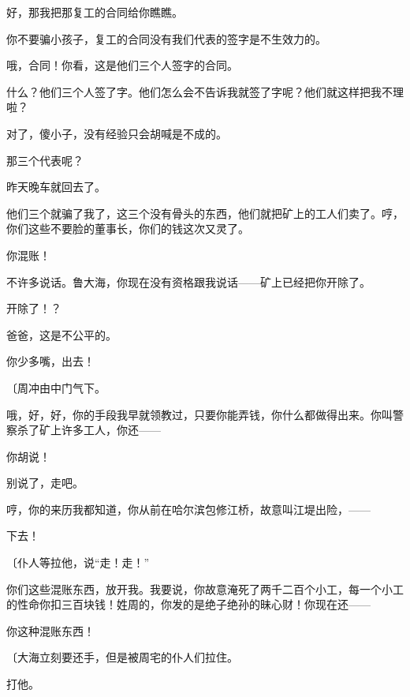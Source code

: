 好，那我把那复工的合同给你瞧瞧。

你不要骗小孩子，复工的合同没有我们代表的签字是不生效力的。

哦，合同！你看，这是他们三个人签字的合同。

什么？他们三个人签了字。他们怎么会不告诉我就签了字呢？他们就这样把我不理啦？

对了，傻小子，没有经验只会胡喊是不成的。

那三个代表呢？

昨天晚车就回去了。

他们三个就骗了我了，这三个没有骨头的东西，他们就把矿上的工人们卖了。哼，你们这些不要脸的董事长，你们的钱这次又灵了。

你混账！

不许多说话。鲁大海，你现在没有资格跟我说话——矿上已经把你开除了。

开除了！？

爸爸，这是不公平的。

你少多嘴，出去！

{\fangsong〔周冲由中门气下。}

哦，好，好，你的手段我早就领教过，只要你能弄钱，你什么都做得出来。你叫警察杀了矿上许多工人，你还——

你胡说！

别说了，走吧。

哼，你的来历我都知道，你从前在哈尔滨包修江桥，故意叫江堤出险，——

下去！

{\fangsong〔仆人等拉他，说“走！走！”}

你们这些混账东西，放开我。我要说，你故意淹死了两千二百个小工，每一个小工的性命你扣三百块钱！姓周的，你发的是绝子绝孙的昧心财！你现在还——

你这种混账东西！

{\fangsong〔大海立刻要还手，但是被周宅的仆人们拉住。}

打他。

